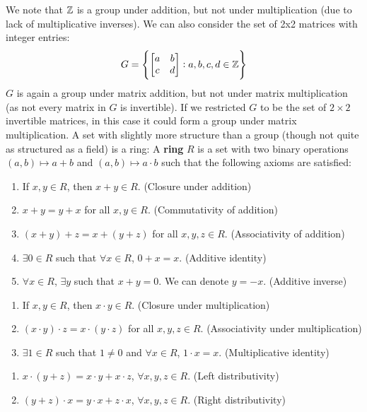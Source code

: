 We note that $\mathbb{Z}$ is a group under addition, but not under multiplication (due to lack of multiplicative inverses). We can also consider the set of 2x2 matrices with integer entries:
\[G = \set{\begin{bmatrix} a & b \\ c & d \end{bmatrix}: a, b, c, d \in \mathbb{Z}}\]
$G$ is again a group under matrix addition, but not under matrix multiplication (as not every matrix in $G$ is invertible). If we restricted $G$ to be the set of $2\times 2$ invertible matrices, in this case it could form a group under matrix multiplication. A set with slightly more structure than a group (though not quite as structured as a field) is a ring:
\newpage 
\noindent A \textbf{ring} $R$ is a set with two binary operations $(a,b) \mapsto a + b$ and $(a, b) \mapsto a \cdot b$ such that the following axioms are satisfied:
\begin{enumerate}[start=1, label={(A\arabic*):}]
    \item If $x, y \in R$, then $x + y \in R$. (Closure under addition)
    \item $x + y = y + x$ for all $x, y \in R$. (Commutativity of addition)
    \item $(x+y) + z = x + (y + z)$ for all $x, y, z \in R$. (Associativity of addition)
    \item $\exists 0 \in R$ such that $\forall x \in R$, $0 + x = x$. (Additive identity)
    \item $\forall x \in R$, $\exists y$ such that $x + y = 0$. We can denote $y = -x$. (Additive inverse)
    \end{enumerate}
    \begin{enumerate}[start=1, label={(M\arabic*):}]
        \item If $x, y \in R$, then $x\cdot y\in R$. (Closure under multiplication)
        \item $(x\cdot y)\cdot z = x \cdot (y \cdot z)$ for all $x, y, z \in R$. (Associativity under multiplication)
        \item $\exists 1 \in R$ such that $1 \neq 0$ and $\forall x \in R$, $1 \cdot x = x$. (Multiplicative identity)
    \end{enumerate}
    \begin{enumerate}[start=1, label={(D\arabic*):}]
        \item $x \cdot (y + z) = x \cdot y + x \cdot z$, $\forall x, y, z \in R$. (Left distributivity)
        \item $(y + z) \cdot x = y \cdot x + z \cdot x$, $\forall x, y, z \in R$. (Right distributivity)
    \end{enumerate}

